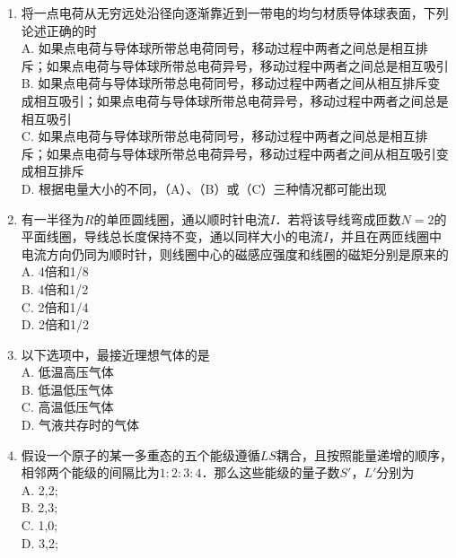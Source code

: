 \begin{enumerate}
\item 将一点电荷从无穷远处沿径向逐渐靠近到一带电的均匀材质导体球表面，下列论述正确的时\\
A. 如果点电荷与导体球所带总电荷同号，移动过程中两者之间总是相互排斥；如果点电荷与导体球所带总电荷异号，移动过程中两者之间总是相互吸引\\
B. 如果点电荷与导体球所带总电荷同号，移动过程中两者之间从相互排斥变成相互吸引；如果点电荷与导体球所带总电荷异号，移动过程中两者之间总是相互吸引\\
C. 如果点电荷与导体球所带总电荷同号，移动过程中两者之间总是相互排斥；如果点电荷与导体球所带总电荷异号，移动过程中两者之间从相互吸引变成相互排斥\\
D. 根据电量大小的不同，（A）、（B）或（C）三种情况都可能出现\\

\item 有一半径为$R$的单匝圆线圈，通以顺时针电流$I$．若将该导线弯成匝数$N=2$的平面线圈，导线总长度保持不变，通以同样大小的电流$I$，并且在两匝线圈中电流方向仍同为顺时针，则线圈中心的磁感应强度和线圈的磁矩分别是原来的\\
A. 4倍和1/8\\
B. 4倍和1/2\\
C. 2倍和1/4\\
D. 2倍和1/2\\

\item 以下选项中，最接近理想气体的是\\
A. 低温高压气体\\
B. 低温低压气体\\
C. 高温低压气体\\
D. 气液共存时的气体\\

\item 假设一个原子的某一多重态的五个能级遵循$LS$耦合，且按照能量递增的顺序，相邻两个能级的间隔比为$1:2:3:4$．那么这些能级的量子数$S'$，$L'$分别为\\
A. 2,2;\\
B. 2,3;\\
C. 1,0;\\
D. 3,2;\\
\end{enumerate}
